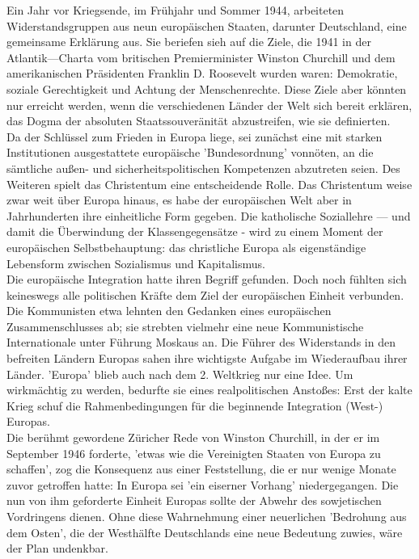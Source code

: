 \documentclass[letterpaper, 12pt]{article}
\begin{document}
Ein Jahr vor
Kriegsende, im Frühjahr und Sommer 1944, arbeiteten Widerstandsgruppen aus neun europäischen Staaten, darunter
Deutschland, eine gemeinsame Erklärung aus. Sie beriefen sieh
auf die Ziele, die 1941 in der Atlantik—Charta vom britischen
Premierminister Winston Churchill und dem amerikanischen
Präsidenten Franklin D. Roosevelt wurden waren: Demokratie, soziale Gerechtigkeit und Achtung der Menschenrechte. Diese Ziele aber könnten nur erreicht werden, wenn die verschiedenen Länder der Welt sich bereit erklären, das Dogma der absoluten Staatssouveränität abzustreifen, wie sie definierten. \\
Da der Schlüssel zum Frieden in Europa liege, sei zunächst eine mit starken Institutionen ausgestattete europäische 'Bundesordnung' vonnöten, an die sämtliche außen- und sicherheitspolitischen Kompetenzen abzutreten seien. Des Weiteren spielt das Christentum eine entscheidende Rolle. Das Christentum weise zwar weit über Europa hinaus, es habe der europäischen Welt aber in Jahrhunderten ihre einheitliche Form gegeben. Die katholische Soziallehre — und damit die Überwindung der Klassengegensätze - wird zu einem Moment der europäischen Selbstbehauptung: das christliche Europa als eigenständige Lebensform zwischen Sozialismus und Kapitalismus. \\
Die europäische Integration hatte ihren Begriff gefunden.
Doch noch fühlten sich keineswegs alle politischen Kräfte dem Ziel der europäischen Einheit verbunden. Die Kommunisten etwa lehnten den Gedanken eines europäischen Zusammenschlusses ab; sie strebten vielmehr eine neue Kommunistische Internationale unter Führung Moskaus an. Die Führer des Widerstands in den befreiten Ländern Europas sahen ihre wichtigste Aufgabe im Wiederaufbau ihrer Länder. 'Europa' blieb auch nach dem 2. Weltkrieg nur eine Idee. Um wirkmächtig zu werden, bedurfte sie eines realpolitischen Anstoßes: Erst der kalte Krieg schuf die Rahmenbedingungen für die beginnende Integration (West-) Europas. \\ Die berühmt gewordene Züricher Rede von Winston Churchill, in der er im September 1946 forderte, 'etwas wie die Vereinigten Staaten von Europa zu schaffen', zog die Konsequenz aus einer Feststellung, die er nur wenige Monate zuvor getroffen hatte: In Europa sei 'ein eiserner Vorhang' niedergegangen. Die nun von ihm geforderte Einheit Europas sollte der Abwehr des sowjetischen Vordringens dienen. Ohne diese Wahrnehmung einer neuerlichen 'Bedrohung aus dem Osten', die der Westhälfte Deutschlands eine neue Bedeutung zuwies, wäre der Plan undenkbar.
\end{document}
